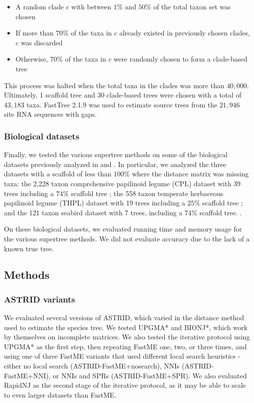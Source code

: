 \begin{itemize}
    \item A random clade $c$ with between $1\%$ and $50\%$ of the total taxon set was chosen
    \item If more than $70\%$ of the taxa in $c$ already existed in previously chosen clades, $c$ was discarded
    \item Otherwise, $70\%$ of the taxa in $c$ were randomly chosen to form a clade-based tree
\end{itemize}

This process was halted when the total taxa in the clades was more than $40,000$. Ultimately, 1 scaffold tree and 30 clade-based trees were chosen with a total of $43,183$ taxa. FastTree 2.1.9 \cite{price2010fasttree} was used to estimate source trees from the $21,946$ site RNA sequences with gaps.

\subsubsection{Biological datasets}

Finally, we tested the various supertree methods on some of the  biological datasets previously analyzed in \cite{fastrfs} and \cite{superfine}. In particular, we analyzed the three datasets with a scaffold of less than $100\%$ where the distance matrix was missing taxa: the 2,228 taxon comprehensive papilinoid legume (CPL) dataset with 39 trees including a $74\%$ scaffold tree \cite{cpl}; the 558 taxon temperate herbaceous papilinoid legume (THPL) dataset with 19 trees including a $25\%$ scaffold tree \cite{wojciechowski2000molecular}; and the 121 taxon seabird dataset with 7 trees, including a $74\%$ scaffold tree. \cite{kennedy2002seabird}.

On these biological datasets, we evaluated running time and memory usage for the various supertree methods. We did not evaluate accuracy due to the lack of a known true tree.

\subsection{Methods}

\subsubsection{ASTRID variants}

We evaluated several versions of ASTRID, which varied in the distance method used to estimate the species tree. We tested UPGMA* and BIONJ*, which work by themselves on incomplete matrices. We also tested the iterative protocol using UPGMA* as the first step, then repeating FastME one, two, or three times, and using one of three FastME variants that used different local search heuristics - either no local search (ASTRID-FastME+nosearch), NNIs (ASTRID-FastME+NNI), or NNIs and SPRs (ASTRID-FastME+SPR). We also evaluated RapidNJ as the second stage of the iterative protocol, as it may be able to scale to even larger datasets than FastME.

